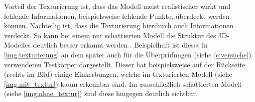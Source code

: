 \documentclass[./00PhotoBox.tex]{subfiles}
\begin{document}
Vorteil der Texturierung ist, dass das Modell meist realistischer wirkt und fehlende Informationen, beispielsweise fehlende Punkte, überdeckt werden können. Nachteilig ist, dass die Texturierung hierdurch auch Informationen verdeckt. So kann bei einem nur schattierten Modell die Struktur des 3D-Modelles deutlich besser erkannt werden \citep[S. 702]{luhmann}. Beispielhaft ist dieses in \autoref{img:texturierung} an dem später auch für die Überprüfungen (siehe \autoref{c:versuche}) verwendeten Testkörper dargestellt. Dieser hat beispielsweise auf der Rückseite (rechts im Bild) einige Einkerbungen, welche im texturierten Modell (siehe \autoref{img:mit_textur}) kaum erkennbar sind. Im ausschließlich schattierten Modell (siehe \autoref{img:ohne_textur}) sind diese hingegen deutlich sichtbar.
\end{document}
